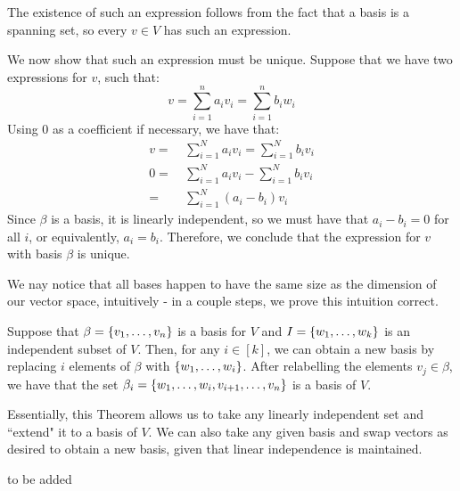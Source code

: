 \documentclass{article}
\begin{document}
\begin{pf}[source=Primary Source Material]
The existence of such an expression follows from the fact that a basis is a spanning set, so every $ v \in V $ has such an expression. \npgh

We now show that such an expression must be unique. Suppose that we have two expressions for $ v $, such that:
\begin{equation*}
    v = \sum_{i=1}^{n} {a_{i}v_{i}} = \sum_{i=1}^{n} {b_{i}w_{i}} 
\end{equation*}
Using 0 as a coefficient if necessary, we have that:
\begin{align*}
    v = \ & \sum_{i=1}^{N} {a_{i}v_{i}} = \sum_{i=1}^{N} {b_{i}v_{i}} \\
    0 = \ & \sum_{i=1}^{N} {a_{i}v_{i}} - \sum_{i=1}^{N} {b_{i}v_{i}}  \\
    = \ & \sum_{i=1}^{N} {(a_{i} - b_{i})v_{i}} 
\end{align*}
Since $ \beta $ is a basis, it is linearly independent, so we must have that $ a_{i} - b_{i} = 0 $ for all $ i $, or equivalently, $ a_{i} = b_{i} $. \vsp
Therefore, we conclude that the expression for $ v $ with basis $ \beta $ is unique.
\end{pf}

We nay notice that all bases happen to have the same size as the dimension of our vector space, intuitively - in a couple steps, we prove this intuition correct.

\begin{thm}[title=Replacement Theorem]
Suppose that $ \beta = \left\{{v_{1}, \dots, v_{n}}\right\} $ is a basis for $ V $ and $ I = \left\{{w_{1}, \dots, w_{k}}\right\} $ is an independent subset of $ V $.
Then, for any $ i \in [k] $, we can obtain a new basis by replacing $ i $ elements of $ \beta $ with $ \left\{{w_{1}, \dots, w_{i}}\right\} $. \vsp
After relabelling the elements $ v_{j} \in \beta $, we have that the set $ \beta_{i} = \left\{{w_{1}, \dots, w_{i}, v_{i+1}, \dots, v_{n}}\right\} $ is a basis of $ V $.
\end{thm}

Essentially, this Theorem allows us to take any linearly independent set and ``extend" it to a basis of $ V $. We can also take any given basis and swap vectors as desired to obtain a new basis,
given that linear independence is maintained.

\begin{pf}[source=Primary Source Material]
to be added
\end{pf}
\end{document}
